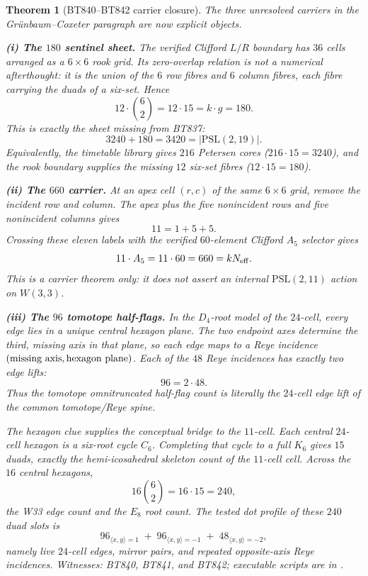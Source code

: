 \documentclass[11pt]{article}
\newtheorem{theorem}{Theorem}[section]
\newcommand{\W}{W(3,3)}
\begin{document}
\begin{theorem}[BT840--BT842 carrier closure]
The three unresolved carriers in the Gr\"unbaum--Coxeter paragraph are
now explicit objects.

\textbf{(i) The $180$ sentinel sheet.}  The verified Clifford $L/R$
boundary has $36$ cells arranged as a $6\times6$ rook grid.  Its
zero-overlap relation is not a numerical afterthought: it is the union
of the $6$ row fibres and $6$ column fibres, each fibre carrying the
duads of a six-set.  Hence
\[
12\cdot \binom62 = 12\cdot15 = k\cdot g = 180.
\]
This is exactly the sheet missing from BT837:
\[
3240+180=3420=|\mathrm{PSL}(2,19)|.
\]
Equivalently, the timetable library gives $216$ Petersen cores
($216\cdot15=3240$), and the rook boundary supplies the missing $12$
six-set fibres ($12\cdot15=180$).

\textbf{(ii) The $660$ carrier.}  At an apex cell $(r,c)$ of the same
$6\times6$ grid, remove the incident row and column.  The apex plus the
five nonincident rows and five nonincident columns gives
\[
11=1+5+5.
\]
Crossing these eleven labels with the verified $60$-element Clifford
$A_5$ selector gives
\[
11\cdot A_5=11\cdot60=660=kN_{\rm eff}.
\]
This is a carrier theorem only: it does not assert an internal
$\mathrm{PSL}(2,11)$ action on $\W$.

\textbf{(iii) The $96$ tomotope half-flags.}  In the $D_4$-root model
of the $24$-cell, every edge lies in a unique central hexagon plane.
The two endpoint axes determine the third, missing axis in that plane,
so each edge maps to a Reye incidence
$(\hbox{missing axis},\hbox{hexagon plane})$.  Each of the $48$ Reye
incidences has exactly two edge lifts:
\[
96=2\cdot48.
\]
Thus the tomotope omnitruncated half-flag count is literally the
$24$-cell edge lift of the common tomotope/Reye spine.

The hexagon clue supplies the conceptual bridge to the $11$-cell.  Each
central $24$-cell hexagon is a six-root cycle $C_6$.  Completing that
cycle to a full $K_6$ gives $15$ duads, exactly the hemi-icosahedral
skeleton count of the $11$-cell cell.  Across the $16$ central
hexagons,
\[
16\binom62=16\cdot15=240,
\]
the W33 edge count and the $E_8$ root count.  The tested dot profile of
these $240$ duad slots is
\[
96_{\langle x,y\rangle=1}
\;+\;
96_{\langle x,y\rangle=-1}
\;+\;
48_{\langle x,y\rangle=-2},
\]
namely live $24$-cell edges, mirror pairs, and repeated opposite-axis
Reye incidences.
\emph{Witnesses: BT840, BT841, and BT842; executable scripts are in
.}
\end{theorem}
\end{document}
